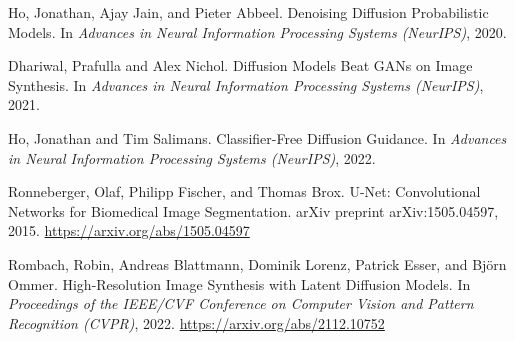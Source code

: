 \documentclass[11pt,a4paper]{article}
\begin{document}
\begin{thebibliography}{4}
    Ho, Jonathan, Ajay Jain, and Pieter Abbeel.
    \newblock Denoising Diffusion Probabilistic Models.
    \newblock In {\em Advances in Neural Information Processing Systems (NeurIPS)}, 2020.
    
    Dhariwal, Prafulla and Alex Nichol.
    \newblock Diffusion Models Beat GANs on Image Synthesis.
    \newblock In {\em Advances in Neural Information Processing Systems (NeurIPS)}, 2021.
    
    Ho, Jonathan and Tim Salimans.
    \newblock Classifier-Free Diffusion Guidance.
    \newblock In {\em Advances in Neural Information Processing Systems (NeurIPS)}, 2022.
    
    Ronneberger, Olaf, Philipp Fischer, and Thomas Brox.
    \newblock U-Net: Convolutional Networks for Biomedical Image Segmentation.
    \newblock arXiv preprint arXiv:1505.04597, 2015. \url{https://arxiv.org/abs/1505.04597}
    
    Rombach, Robin, Andreas Blattmann, Dominik Lorenz, Patrick Esser, and Björn Ommer.
    \newblock High-Resolution Image Synthesis with Latent Diffusion Models.
    \newblock In \emph{Proceedings of the IEEE/CVF Conference on Computer Vision and Pattern Recognition (CVPR)}, 2022. \url{https://arxiv.org/abs/2112.10752}
    \end{thebibliography}
    
    
\end{document}
